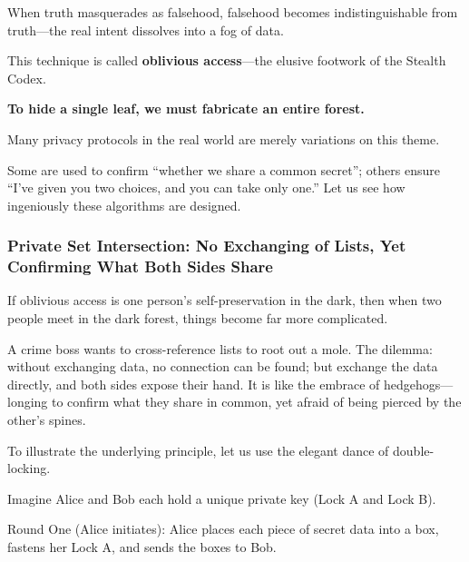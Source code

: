 \vspace{1em}

When truth masquerades as falsehood, falsehood becomes indistinguishable from truth---the real intent dissolves into a fog of data.

This technique is called \textbf{oblivious access}---the elusive footwork of the Stealth Codex.

\begin{importantbox}
\textbf{To hide a single leaf, we must fabricate an entire forest.}
\end{importantbox}

Many privacy protocols in the real world are merely variations on this theme.

Some are used to confirm ``whether we share a common secret''; others ensure ``I've given you two choices, and you can take only one.'' Let us see how ingeniously these algorithms are designed.

\newpage
{}
{}

\subsubsection{Private Set Intersection: No Exchanging of Lists, Yet Confirming What Both Sides Share}

If oblivious access is one person's self-preservation in the dark, then when two people meet in the dark forest, things become far more complicated.

A crime boss wants to cross-reference lists to root out a mole. The dilemma: without exchanging data, no connection can be found; but exchange the data directly, and both sides expose their hand. It is like the embrace of hedgehogs---longing to confirm what they share in common, yet afraid of being pierced by the other's spines.

\vspace{1em}

To illustrate the underlying principle, let us use the elegant dance of double-locking.

Imagine Alice and Bob each hold a unique private key (Lock A and Lock B).

Round One (Alice initiates): Alice places each piece of secret data into a box, fastens her Lock A, and sends the boxes to Bob.

